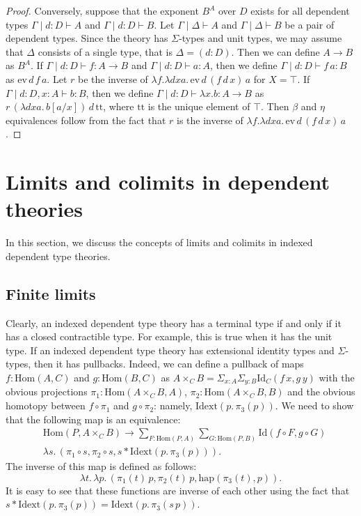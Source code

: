 \documentclass[reqno]{amsart}
\theoremstyle{definition}
\theoremstyle{remark}
\newcommand{\ob}{}
\newcommand{\fs}[1]{\mathrm{#1}}
\newcommand{\Hom}{\fs{Hom}}
\newcommand{\Id}{\fs{Id}}
\numberwithin{figure}{section}
\begin{document}
\begin{proof}
Conversely, suppose that the exponent $B^A$ over $D$ exists for all dependent types $\Gamma \mid d : D \vdash A \ob$ and $\Gamma \mid d : D \vdash B \ob$.
Let $\Gamma \mid \Delta \vdash A \ob$ and $\Gamma \mid \Delta \vdash B \ob$ be a pair of dependent types.
Since the theory has $\Sigma$-types and unit types, we may assume that $\Delta$ consists of a single type, that is $\Delta = (d : D)$.
Then we can define $A \to B$ as $B^A$.
If $\Gamma \mid d : D \vdash f : A \to B$ and $\Gamma \mid d : D \vdash a : A$, then we define $\Gamma \mid d : D \vdash f\,a : B$ as $\fs{ev}\,d\,f\,a$.
Let $r$ be the inverse of $\lambda f. \lambda d x a.\,\fs{ev}\,d\,(f\,d\,x)\,a$ for $X = \top$.
If $\Gamma \mid d : D, x : A \vdash b : B$, then we define $\Gamma \mid d : D \vdash \lambda x.b : A \to B$ as $r\,(\lambda d x a.\,b[a/x])\,d\,\fs{tt}$, where $\fs{tt}$ is the unique element of $\top$.
Then $\beta$ and $\eta$ equivalences follow from the fact that $r$ is the inverse of $\lambda f. \lambda d x a.\,\fs{ev}\,d\,(f\,d\,x)\,a$.
\end{proof}

\section{Limits and colimits in dependent theories}
\label{sec:colimits-dep}

In this section, we discuss the concepts of limits and colimits in indexed dependent type theories.

\subsection{Finite limits}

Clearly, an indexed dependent type theory has a terminal type if and only if it has a closed contractible type.
For example, this is true when it has the unit type.
If an indexed dependent type theory has extensional identity types and $\Sigma$-types, then it has pullbacks.
Indeed, we can define a pullback of maps $f : \Hom(A,C)$ and $g : \Hom(B,C)$ as $A \times_C B = \Sigma_{x : A} \Sigma_{y : B} \Id_C(f\,x,g\,y)$
with the obvious projections $\pi_1 : \Hom(A \times_C B, A)$, $\pi_2 : \Hom(A \times_C B, B)$ and the obvious homotopy between $f \circ \pi_1$ and $g \circ \pi_2$: namely, $\fs{Idext}(p.\,\pi_3(p))$.
We need to show that the following map is an equivalence:
\begin{align*}
& \Hom(P, A \times_C B) \to \sum_{F : \Hom(P,A)} \sum_{G : \Hom(P,B)} \Id(f \circ F, g \circ G) \\
& \lambda s.\,(\pi_1 \circ s, \pi_2 \circ s, s * \fs{Idext}(p.\,\pi_3(p))).
\end{align*}
The inverse of this map is defined as follows:
\[ \lambda t.\,\lambda p.\,(\pi_1(t)\,p, \pi_2(t)\,p, \fs{hap}(\pi_3(t),p)). \]
It is easy to see that these functions are inverse of each other using the fact that $s * \fs{Idext}(p.\,\pi_3(p)) = \fs{Idext}(p.\,\pi_3(s\,p))$.
\end{document}
